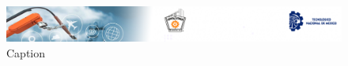 
% 
% 
\begin{figure}[H]
    \centering
    \includegraphics[trim = {1mm 1mm 1mm 1mm},clip,scale=0.2]{img/Encabezado.PNG}
    \caption{Caption}
    \label{fig:enter-label}
\end{figure}